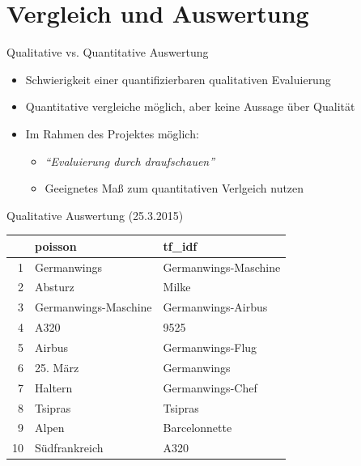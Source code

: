 \documentclass{beamer}
\begin{document}
\section{Vergleich und Auswertung}
\begin{frame} \sectionpage \end{frame}
\begin{frame}{Qualitative vs. Quantitative Auswertung}
	\begin{itemize}
		\item{Schwierigkeit einer quantifizierbaren qualitativen Evaluierung}
		\item{Quantitative vergleiche m\"oglich, aber keine Aussage \"uber Qualit\"at}
		\item{Im Rahmen des Projektes m\"oglich:
			\begin{itemize}
				\item{\emph{``Evaluierung durch draufschauen''}}
				\item{Geeignetes Maß zum quantitativen Verlgeich nutzen}
			\end{itemize}
		}
	\end{itemize}
\end{frame}

\begin{frame}{Qualitative Auswertung (25.3.2015)}
\begin{table}[ht]
\centering
\begin{tabular}{rll}
  \hline
 & poisson & tf\_idf \\ 
  \hline
1 & Germanwings & Germanwings-Maschine \\ 
  2 & Absturz & Milke \\ 
  3 & Germanwings-Maschine & Germanwings-Airbus \\ 
  4 & A320 & 9525 \\ 
  5 & Airbus & Germanwings-Flug \\ 
  6 & 25. März & Germanwings \\ 
  7 & Haltern & Germanwings-Chef \\ 
  8 & Tsipras & Tsipras \\ 
  9 & Alpen & Barcelonnette \\ 
  10 & Südfrankreich & A320 \\ 
   \hline
\end{tabular}
\end{table}
\end{frame}
\end{document}
